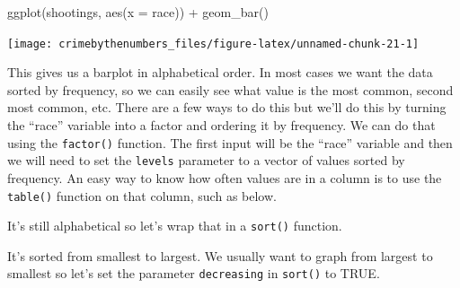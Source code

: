 \documentclass[
]{krantz}
\makeatletter
\newenvironment{Shaded}{\begin{snugshade}}{\end{snugshade}}
\newcommand{\AttributeTok}[1]{\textcolor[rgb]{0.61,0.61,0.61}{#1}}
\newcommand{\CommentTok}[1]{\textcolor[rgb]{0.37,0.37,0.37}{\textit{#1}}}
\newcommand{\FunctionTok}[1]{\textcolor[rgb]{0,0,0}{#1}}
\newcommand{\NormalTok}[1]{#1}
\newcommand{\SpecialCharTok}[1]{\textcolor[rgb]{0,0,0}{#1}}
\newenvironment{kframe}{%
\medskip{}
\setlength{\fboxsep}{.8em}
 \def\at@end@of@kframe{}%
 \ifinner\ifhmode%
  \def\at@end@of@kframe{\end{minipage}}%
  \begin{minipage}{\columnwidth}%
 \fi\fi%
 \def\FrameCommand##1{\hskip\@totalleftmargin \hskip-\fboxsep
 \colorbox{shadecolor}{##1}\hskip-\fboxsep
     \hskip-\linewidth \hskip-\@totalleftmargin \hskip\columnwidth}%
 \MakeFramed {\advance\hsize-\width
   \@totalleftmargin\z@ \linewidth\hsize
   \@setminipage}}%
 {\par\unskip\endMakeFramed%
 \at@end@of@kframe}
\renewenvironment{Shaded}{\begin{kframe}}{\end{kframe}}
\makeatother
\begin{document}
\begin{Shaded}
\begin{Highlighting}[]
\FunctionTok{ggplot}\NormalTok{(shootings, }\FunctionTok{aes}\NormalTok{(}\AttributeTok{x =}\NormalTok{ race)) }\SpecialCharTok{+} 
  \FunctionTok{geom\_bar}\NormalTok{()}
\end{Highlighting}
\end{Shaded}

\begin{center}\texttt{[image: crimebythenumbers\_files/figure-latex/unnamed-chunk-21-1]} \end{center}

This gives us a barplot in alphabetical order. In most cases we want the data sorted by frequency, so we can easily see what value is the most common, second most common, etc. There are a few ways to do this but we'll do this by turning the ``race'' variable into a factor and ordering it by frequency. We can do that using the \texttt{factor()} function. The first input will be the ``race'' variable and then we will need to set the \texttt{levels} parameter to a vector of values sorted by frequency. An easy way to know how often values are in a column is to use the \texttt{table()} function on that column, such as below.

\begin{Shaded}
\end{Shaded}

It's still alphabetical so let's wrap that in a \texttt{sort()} function.

\begin{Shaded}
\end{Shaded}

It's sorted from smallest to largest. We usually want to graph from largest to smallest so let's set the parameter \texttt{decreasing} in \texttt{sort()} to TRUE.
\end{document}
